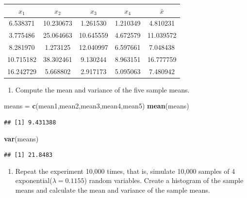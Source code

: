 \documentclass[
  11pt,
  oneside]{book}
\newenvironment{Shaded}{\begin{snugshade}}{\end{snugshade}}
\newcommand{\FunctionTok}[1]{\textcolor[rgb]{0.13,0.29,0.53}{\textbf{#1}}}
\newcommand{\NormalTok}[1]{#1}
\newcommand{\OtherTok}[1]{\textcolor[rgb]{0.56,0.35,0.01}{#1}}
\providecommand{\tightlist}{%
  \setlength{\itemsep}{0pt}\setlength{\parskip}{0pt}}
\theoremstyle{definition}
\theoremstyle{definition}
\theoremstyle{definition}
\theoremstyle{definition}
\theoremstyle{remark}
\begin{document}
\begin{table}[!h]
\centering
\begin{tabular}{c|c|c|c|c}
\hline
$x_1$ & $x_2$ & $x_3$ & $x_4$ & $\bar{x}$\\
\hline
6.538371 & 10.230673 & 1.261530 & 1.210349 & 4.810231\\
\hline
3.775486 & 25.064663 & 10.645559 & 4.672579 & 11.039572\\
\hline
8.281970 & 1.273125 & 12.040997 & 6.597661 & 7.048438\\
\hline
10.715182 & 38.302461 & 9.130244 & 8.963151 & 16.777759\\
\hline
16.242729 & 5.668802 & 2.917173 & 5.095063 & 7.480942\\
\hline
\end{tabular}
\end{table}

\vspace{0.5cm}

\begin{enumerate}
\def\labelenumi{(\alph{enumi})}
\setcounter{enumi}{2}
\tightlist
\item
  Compute the mean and variance of the five sample means.
\end{enumerate}

\vspace{0.5cm}

\begin{Shaded}
\begin{Highlighting}[]
\NormalTok{means }\OtherTok{=} \FunctionTok{c}\NormalTok{(mean1,mean2,mean3,mean4,mean5)}
\FunctionTok{mean}\NormalTok{(means)}
\end{Highlighting}
\end{Shaded}

\begin{verbatim}
## [1] 9.431388
\end{verbatim}

\begin{Shaded}
\begin{Highlighting}[]
\FunctionTok{var}\NormalTok{(means)}
\end{Highlighting}
\end{Shaded}

\begin{verbatim}
## [1] 21.8483
\end{verbatim}

\vspace{0.5cm}

\begin{enumerate}
\def\labelenumi{(\alph{enumi})}
\setcounter{enumi}{3}
\tightlist
\item
  Repeat the experiment 10,000 times, that is, simulate 10,000 samples of 4 exponential(\(\lambda=0.1155\)) random variables. Create a histogram of the sample means and calculate the mean and variance of the sample means.
\end{enumerate}
\end{document}
